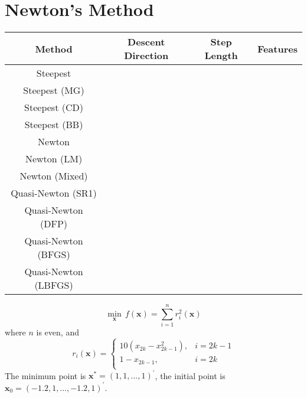 \section{Newton's Method}

\begin{table}[htbp]
    \centering
    \begin{tabular}{cccc}
        \toprule
        Method & Descent Direction & Step Length & Features \\
        \midrule
        Steepest                                            \\
        Steepest (MG)                                       \\
        Steepest (CD)                                       \\
        Steepest (BB)                                       \\
        \midrule
        Newton                                              \\
        Newton (LM)                                         \\
        Newton (Mixed)                                      \\
        \midrule
        Quasi-Newton (SR1)                                  \\
        Quasi-Newton (DFP)                                  \\
        Quasi-Newton (BFGS)                                 \\
        Quasi-Newton (LBFGS)                                \\
        \bottomrule
    \end{tabular}
\end{table}

\begin{example}
    \begin{equation}
        \min_{\mathbf{x}}\,f(\mathbf{x})=\sum_{i=1}^{n}r_{i}^{2}(\mathbf{x})
    \end{equation}
    where $n$ is even, and
    \begin{equation}
        r_{i}(\mathbf{x})=\begin{cases}
            10(x_{2k}-x_{2k-1}^{2}), & i=2k-1 \\
            1-x_{2k-1},              & i=2k   \\
        \end{cases}
    \end{equation}
    The minimum point is $\mathbf{x}^{*}=(1,1,\ldots,1)^{\prime}$, the initial point is $\mathbf{x}_{0}=(-1.2,1,\ldots,-1.2,1)^{\prime}$.
\end{example}